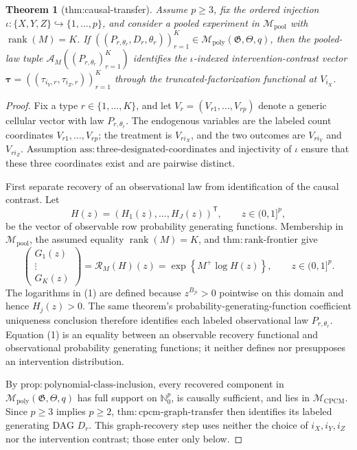 \documentclass{article}
\newtheorem{theorem}{Theorem}
\begin{document}
\begin{theorem}[thm:causal-transfer]\label{thm:causal-transfer}
Assume \(p\geq3\), fix the ordered injection \(\iota:\{X,Y,Z\}\hookrightarrow\{1,\ldots,p\}\), and consider a pooled experiment in \(\mathcal M_{\mathrm{pool}}\) with \(\operatorname{rank}(M)=K\). If \(((P_{r,\theta_r},D_r,\theta_r))_{r=1}^{K}\in\mathcal M_{\mathrm{poly}}(\mathfrak G,\Theta,q)\), then the pooled-law tuple \(\mathscr A_M((P_{r,\theta_r})_{r=1}^{K})\) identifies the \(\iota\)-indexed intervention-contrast vector \(\boldsymbol\tau=((\tau_{i_Y,r},\tau_{i_Z,r}))_{r=1}^{K}\) through the truncated-factorization functional at \(V_{i_X}\).
\end{theorem}
\begin{proof}
Fix a type \(r\in\{1,\ldots,K\}\), and let \(V_r=(V_{r1},\ldots,V_{rp})\) denote a generic cellular vector with law \(P_{r,\theta_r}\).  The endogenous variables are the labeled count coordinates \(V_{r1},\ldots,V_{rp}\); the treatment is \(V_{r i_X}\), and the two outcomes are \(V_{r i_Y}\) and \(V_{r i_Z}\).  Assumption \(\mathrm{ass{:}three\text{-}designated\text{-}coordinates}\) and injectivity of \(\iota\) ensure that these three coordinates exist and are pairwise distinct.

First separate recovery of an observational law from identification of the causal contrast.  Let
\[
H(z)=(H_1(z),\ldots,H_J(z))^{\mathsf T},\qquad z\in(0,1]^p,
\]
be the vector of observable row probability generating functions.  Membership in \(\mathcal M_{\mathrm{pool}}\), the assumed equality \(\operatorname{rank}(M)=K\), and \(\mathrm{thm{:}rank\text{-}frontier}\) give
\[
\begin{pmatrix}G_1(z)\\ \vdots\\ G_K(z)\end{pmatrix}
=\mathscr R_M(H)(z)
=\exp\!\left\{M^+\log H(z)\right\},
\qquad z\in(0,1]^p. \tag{1}
\]
The logarithms in (1) are defined because \(z^{B_{ji}}>0\) pointwise on this domain and hence \(H_j(z)>0\).  The same theorem's probability-generating-function coefficient uniqueness conclusion therefore identifies each labeled observational law \(P_{r,\theta_r}\).  Equation (1) is an equality between an observable recovery functional and observational probability generating functions; it neither defines nor presupposes an intervention distribution.

By \(\mathrm{prop{:}polynomial\text{-}class\text{-}inclusion}\), every recovered component in \(\mathcal M_{\mathrm{poly}}(\mathfrak G,\Theta,q)\) has full support on \(\mathbb N_0^p\), is causally sufficient, and lies in \(\mathcal M_{\mathrm{CPCM}}\).  Since \(p\geq3\) implies \(p\geq2\), \(\mathrm{thm{:}cpcm\text{-}graph\text{-}transfer}\) then identifies its labeled generating DAG \(D_r\).  This graph-recovery step uses neither the choice of \(i_X,i_Y,i_Z\) nor the intervention contrast; those enter only below.


\end{proof}
\end{document}
